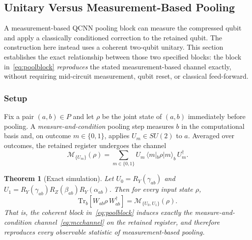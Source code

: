 \documentclass[conference]{IEEEtran}
\newtheorem{theorem}{Theorem}
\begin{document}
\subsection{Unitary Versus Measurement-Based Pooling}
\label{sec:pooling-theory}

A measurement-based QCNN pooling block can measure the compressed qubit and apply a classically conditioned correction to the retained qubit. The construction here instead uses a coherent two-qubit unitary. This section establishes the exact relationship between those two specified blocks: the block in~\eqref{eq:poolblock} \emph{reproduces} the stated measurement-based channel exactly, without requiring mid-circuit measurement, qubit reset, or classical feed-forward.

\subsubsection{Setup}
Fix a pair $(a,b) \in P$ and let $\rho$ be the joint state of $(a,b)$ immediately before pooling. A \emph{measure-and-condition} pooling step measures $b$ in the computational basis and, on outcome $m \in \{0,1\}$, applies $U_m \in SU(2)$ to $a$. Averaged over outcomes, the retained register undergoes the channel
\begin{equation}
\mathcal{M}_{\{U_m\}}(\rho) = \sum_{m \in \{0,1\}} U_m \, \langle m |_b \rho | m \rangle_b \, U_m^{\dagger}.
\label{eq:mcchannel}
\end{equation}

\begin{theorem}[Exact simulation]
\label{thm:exact}
Let $U_0 = R_Y(\gamma_{ab})$ and $U_1 = R_Y(\gamma_{ab}) R_Z(\beta_{ab}) R_Y(\alpha_{ab})$. Then for every input state $\rho$,
\begin{equation}
\mathrm{Tr}_b\!\left[ W_{ab} \rho\, W_{ab}^{\dagger} \right] = \mathcal{M}_{\{U_0, U_1\}}(\rho).
\end{equation}
That is, the coherent block in~\eqref{eq:poolblock} induces exactly the measure-and-condition channel~\eqref{eq:mcchannel} on the retained register, and therefore reproduces every observable statistic of measurement-based pooling.
\end{theorem}
\end{document}
